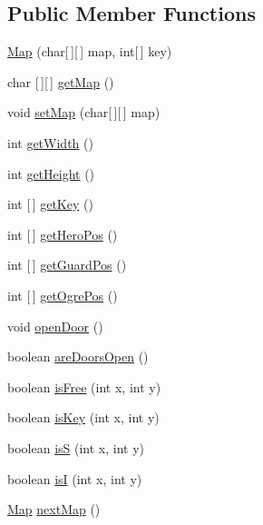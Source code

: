\subsection*{Public Member Functions}
\begin{DoxyCompactItemize}
\item 
\hyperlink{classdkeep_1_1logic_1_1_map_a21bca3900428a3b8825b6da6214f2996}{Map} (char\mbox{[}$\,$\mbox{]}\mbox{[}$\,$\mbox{]} map, int\mbox{[}$\,$\mbox{]} key)
\item 
char \mbox{[}$\,$\mbox{]}\mbox{[}$\,$\mbox{]} \hyperlink{classdkeep_1_1logic_1_1_map_ab9624f3fa58049b3481f95e4c77277a3}{get\+Map} ()
\item 
void \hyperlink{classdkeep_1_1logic_1_1_map_af00c4221d9896abaa16dff00a462ba23}{set\+Map} (char\mbox{[}$\,$\mbox{]}\mbox{[}$\,$\mbox{]} map)
\item 
int \hyperlink{classdkeep_1_1logic_1_1_map_ad066c2de42a31b55a7649149cac143b2}{get\+Width} ()
\item 
int \hyperlink{classdkeep_1_1logic_1_1_map_aec82d7520e74ad90f897a34c30ebc056}{get\+Height} ()
\item 
int \mbox{[}$\,$\mbox{]} \hyperlink{classdkeep_1_1logic_1_1_map_aba4049e879891996457634979ec146a7}{get\+Key} ()
\item 
int \mbox{[}$\,$\mbox{]} \hyperlink{classdkeep_1_1logic_1_1_map_a94bbd79e68a9e0901cb129f9ef7bfa37}{get\+Hero\+Pos} ()
\item 
int \mbox{[}$\,$\mbox{]} \hyperlink{classdkeep_1_1logic_1_1_map_aeaad6dec94f54cf67dcb5c2bd23adbbf}{get\+Guard\+Pos} ()
\item 
int \mbox{[}$\,$\mbox{]} \hyperlink{classdkeep_1_1logic_1_1_map_a8dae121a32549da2035765a886f92d68}{get\+Ogre\+Pos} ()
\item 
void \hyperlink{classdkeep_1_1logic_1_1_map_a2d626ecdbda836f971f08ad31eadbd7b}{open\+Door} ()
\item 
boolean \hyperlink{classdkeep_1_1logic_1_1_map_a2237fa9a56d3aa3be8638be42bbc16e6}{are\+Doors\+Open} ()
\item 
boolean \hyperlink{classdkeep_1_1logic_1_1_map_a821f7fc33840cec683d9fe1d7146a3a5}{is\+Free} (int x, int y)
\item 
boolean \hyperlink{classdkeep_1_1logic_1_1_map_a721b87b71cb211ab754b9077963546f3}{is\+Key} (int x, int y)
\item 
boolean \hyperlink{classdkeep_1_1logic_1_1_map_a9af86cd24b6080738ca2059077249ff2}{isS} (int x, int y)
\item 
boolean \hyperlink{classdkeep_1_1logic_1_1_map_aa0e97d3c7fc51f4fa0caaa286745ff72}{isI} (int x, int y)
\item 
\hyperlink{classdkeep_1_1logic_1_1_map}{Map} \hyperlink{classdkeep_1_1logic_1_1_map_a05fd3c758bc198e790c9f04f2004bcb9}{next\+Map} ()
\end{DoxyCompactItemize}
